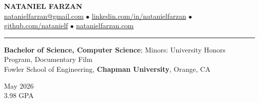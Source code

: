 \documentclass[letter]{article}
\begin{document}
    \begin{center}
        {\huge \textbf{\uppercase{Nataniel Farzan}}} \\
        \href{mailto:natanielfarzan@gmail.com}{natanielfarzan@gmail.com} $\bullet$
        \href{https://www.linkedin.com/in/natanielfarzan}{linkedin.com/in/natanielfarzan} $\bullet$
        \href{https://github.com/natanielf}{github.com/natanielf} $\bullet$
        \href{https://natanielfarzan.com/}{natanielfarzan.com}
    \end{center}

    \vspace{4pt}
    \hrule height 1pt
    \vspace{4pt}
    \noindent
    \begin{minipage}[c]{0.89\linewidth}
        \noindent \textbf{Bachelor of Science, Computer Science}; Minors: University Honors Program, Documentary Film \\
        \noindent Fowler School of Engineering, \textbf{Chapman University}, Orange, CA \\
    \end{minipage}
    \begin{minipage}[c]{0.105\linewidth}
        \vspace*{-\baselineskip}
        \begin{flushright}
            May 2026 \\
            3.98 GPA \\
        \end{flushright}
    \end{minipage}
\end{document}
